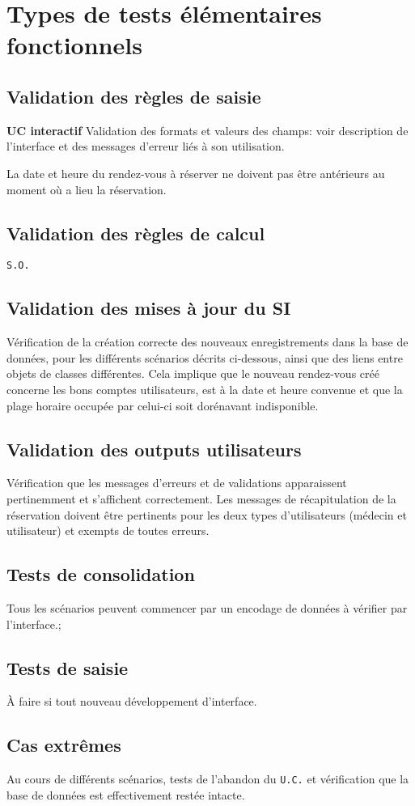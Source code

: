\documentclass[a4paper, 11pt]{report}
\begin{document}
	\section{Types de tests élémentaires fonctionnels}
	\subsection{Validation des règles de saisie}
	\textbf{UC interactif}
	Validation des formats et valeurs des champs: voir description de l’interface et
	des messages d’erreur liés à son utilisation.

	La date et heure du rendez-vous à réserver ne doivent pas être antérieurs au
	moment où a lieu la réservation. 
	\subsection{Validation des règles de calcul}
	\texttt{S.O.}
	\subsection{Validation des mises à jour du SI}
	Vérification de la création correcte des nouveaux enregistrements dans la base
	de données, pour les différents scénarios décrits ci-dessous, ainsi que des
	liens entre objets de classes différentes. 
	Cela implique que le nouveau rendez-vous créé concerne les bons comptes
	utilisateurs, est à la date et heure convenue et que la plage horaire occupée
	par celui-ci soit dorénavant indisponible.
	\subsection{Validation des outputs utilisateurs}
	Vérification que les messages d’erreurs et de validations apparaissent
	pertinemment et s’affichent correctement. Les messages de récapitulation de la
	réservation doivent être pertinents pour les deux types d’utilisateurs (médecin
	et utilisateur) et exempts de toutes erreurs.
	\subsection{Tests de consolidation}
	Tous les scénarios peuvent commencer par un encodage de données à 
	vérifier par l’interface.;
	\subsection{Tests de saisie}
	À faire si tout nouveau développement d’interface.
	\subsection{Cas extrêmes}
	Au cours de différents scénarios, tests de l'abandon du \texttt{U.C.} et vérification que
	la base de données est effectivement restée intacte.
\end{document}
